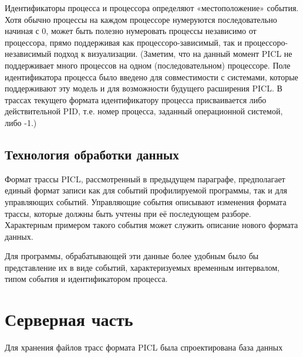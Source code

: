 Идентификаторы процесса и процессора определяют «местоположение» события. Хотя обычно процессы на каждом процессоре нумеруются последовательно начиная с 0, может быть полезно нумеровать процессы независимо от процессора, прямо поддерживая как процессоро-зависимый, так и процессоро-независимый подход к визуализации. (Заметим, что на данный момент PICL не поддерживает много процессов на одном (последовательном) процессоре. Поле идентификатора процесса было введено для совместимости с системами, которые поддерживают эту модель и для возможности будущего расширения PICL. В трассах текущего формата идентификатору процесса присваивается либо действительной PID, т.е. номер процесса, заданный операционной системой, либо -1.)
\subsection{Технология обработки данных}
Формат трассы PICL, рассмотренный в предыдущем параграфе, предполагает единый формат записи как для событий профилируемой программы, так и для управляющих событий. Управляющие события описывают изменения формата трассы, которые должны быть учтены при её последующем разборе. Характерным примером такого события может служить описание нового формата данных.

Для программы, обрабатывающей эти данные более удобным было бы представление их в виде событий, характеризуемых временным интервалом, типом события и идентификатором процесса.
\section{Серверная часть}
Для хранения файлов трасс формата PICL была спроектирована база данных
